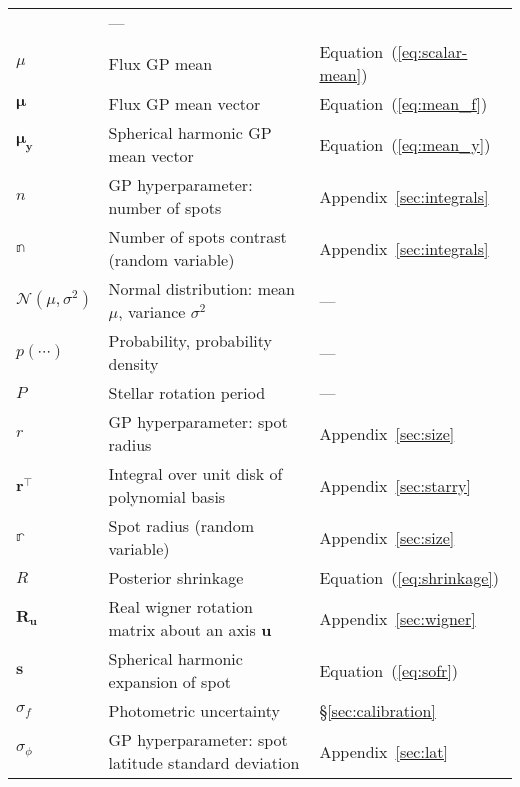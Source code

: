 \begin{center}
\begin{longtable}{W{c}{1cm} W{l}{9cm} W{l}{2cm}}
         & ---
        \\
        $\mu$
         & Flux GP mean
         & Equation~(\ref{eq:scalar-mean})
        \\
        $\pmb{\mu}$
         & Flux GP mean vector
         & Equation~(\ref{eq:mean_f})
        \\
        $\pmb{\mu}_\mathbf{y}$
         & Spherical harmonic GP mean vector
         & Equation~(\ref{eq:mean_y})
        \\
        $n$
         & GP hyperparameter: number of spots
         & Appendix~\ref{sec:integrals}
        \\
        $\mathbb{n}$
         & Number of spots contrast (random variable)
         & Appendix~\ref{sec:integrals}
        \\
        $\mathcal{N}(\mu, \sigma^2)$
         & Normal distribution: mean $\mu$, variance $\sigma^2$
         & ---
        \\
        $p(\cdots)$
         & Probability, probability density
         & ---
        \\
        $P$
         & Stellar rotation period
         & ---
        \\
        $r$
         & GP hyperparameter: spot radius
         & Appendix~\ref{sec:size}
        \\
        $\mathbf{r}^\top$
         & Integral over unit disk of polynomial basis
         & Appendix~\ref{sec:starry}
        \\
        $\mathbb{r}$
         & Spot radius (random variable)
         & Appendix~\ref{sec:size}
        \\
        $R$
         & Posterior shrinkage
         & Equation~(\ref{eq:shrinkage})
        \\
        $\mathbf{R}_\mathbf{u}$
         & Real wigner rotation matrix about an axis $\mathbf{u}$
         & Appendix~\ref{sec:wigner}
        \\
        $\mathbf{s}$
         & Spherical harmonic expansion of spot
         & Equation~(\ref{eq:sofr})
        \\
        $\sigma_f$
         & Photometric uncertainty
         & \S\ref{sec:calibration}
        \\
        $\sigma_\phi$
         & GP hyperparameter: spot latitude standard deviation
         & Appendix~\ref{sec:lat}
        \\

\end{longtable}
\end{center}
